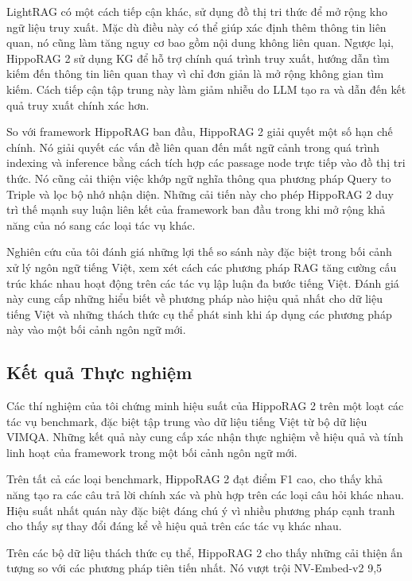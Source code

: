 \documentclass[../main.tex]{subfiles}
\begin{document}
LightRAG có một cách tiếp cận khác, sử dụng đồ thị tri thức để mở rộng kho ngữ liệu truy xuất. Mặc dù điều này có thể giúp xác định thêm thông tin liên quan, nó cũng làm tăng nguy cơ bao gồm nội dung không liên quan. Ngược lại, HippoRAG 2 sử dụng KG để hỗ trợ chính quá trình truy xuất, hướng dẫn tìm kiếm đến thông tin liên quan thay vì chỉ đơn giản là mở rộng không gian tìm kiếm. Cách tiếp cận tập trung này làm giảm nhiễu do LLM tạo ra và dẫn đến kết quả truy xuất chính xác hơn.

So với framework HippoRAG ban đầu, HippoRAG 2 giải quyết một số hạn chế chính. Nó giải quyết các vấn đề liên quan đến mất ngữ cảnh trong quá trình indexing và inference bằng cách tích hợp các passage node trực tiếp vào đồ thị tri thức. Nó cũng cải thiện việc khớp ngữ nghĩa thông qua phương pháp Query to Triple và lọc bộ nhớ nhận diện. Những cải tiến này cho phép HippoRAG 2 duy trì thế mạnh suy luận liên kết của framework ban đầu trong khi mở rộng khả năng của nó sang các loại tác vụ khác.

Nghiên cứu của tôi đánh giá những lợi thế so sánh này đặc biệt trong bối cảnh xử lý ngôn ngữ tiếng Việt, xem xét cách các phương pháp RAG tăng cường cấu trúc khác nhau hoạt động trên các tác vụ lập luận đa bước tiếng Việt. Đánh giá này cung cấp những hiểu biết về phương pháp nào hiệu quả nhất cho dữ liệu tiếng Việt và những thách thức cụ thể phát sinh khi áp dụng các phương pháp này vào một bối cảnh ngôn ngữ mới.

\subsection{Kết quả Thực nghiệm}
Các thí nghiệm của tôi chứng minh hiệu suất của HippoRAG 2 trên một loạt các tác vụ benchmark, đặc biệt tập trung vào dữ liệu tiếng Việt từ bộ dữ liệu VIMQA. Những kết quả này cung cấp xác nhận thực nghiệm về hiệu quả và tính linh hoạt của framework trong một bối cảnh ngôn ngữ mới.

Trên tất cả các loại benchmark, HippoRAG 2 đạt điểm F1 cao, cho thấy khả năng tạo ra các câu trả lời chính xác và phù hợp trên các loại câu hỏi khác nhau. Hiệu suất nhất quán này đặc biệt đáng chú ý vì nhiều phương pháp cạnh tranh cho thấy sự thay đổi đáng kể về hiệu quả trên các tác vụ khác nhau.

Trên các bộ dữ liệu thách thức cụ thể, HippoRAG 2 cho thấy những cải thiện ấn tượng so với các phương pháp tiên tiến nhất. Nó vượt trội NV-Embed-v2 9,5%
\end{document}
